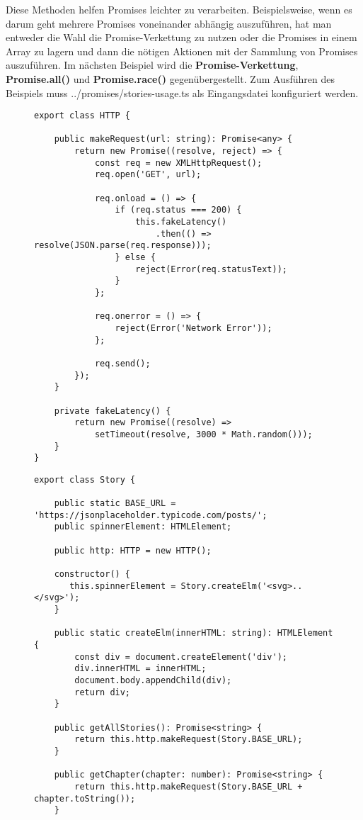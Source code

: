 \noindent
Diese Methoden helfen Promises leichter zu verarbeiten. Beispielsweise, wenn es darum geht mehrere Promises voneinander abhängig auszuführen, hat man entweder die Wahl die Promise-Verkettung zu nutzen oder die Promises in einem Array zu lagern und dann die nötigen Aktionen mit der Sammlung von Promises auszuführen. Im nächsten Beispiel wird die \textbf{Promise-Verkettung}, \textbf{Promise.all()} und \textbf{Promise.race()} gegenübergestellt. Zum Ausführen des Beispiels muss ../promises/stories-usage.ts als Eingangsdatei konfiguriert werden.


\begin{figure}[H]
\begin{lstlisting}[basicstyle=\small]
export class HTTP {

    public makeRequest(url: string): Promise<any> {
        return new Promise((resolve, reject) => {
            const req = new XMLHttpRequest();
            req.open('GET', url);

            req.onload = () => {
                if (req.status === 200) {
                    this.fakeLatency()
                        .then(() => resolve(JSON.parse(req.response)));
                } else {
                    reject(Error(req.statusText));
                }
            };

            req.onerror = () => {
                reject(Error('Network Error'));
            };

            req.send();
        });
    }

    private fakeLatency() {
        return new Promise((resolve) =>
            setTimeout(resolve, 3000 * Math.random()));
    }
}
\end{lstlisting}
\end{figure}

\begin{figure}[H]
\begin{lstlisting}[basicstyle=\small]
export class Story {

    public static BASE_URL = 'https://jsonplaceholder.typicode.com/posts/';
    public spinnerElement: HTMLElement;

    public http: HTTP = new HTTP();

    constructor() {
       this.spinnerElement = Story.createElm('<svg>..</svg>');
    }

    public static createElm(innerHTML: string): HTMLElement {
        const div = document.createElement('div');
        div.innerHTML = innerHTML;
        document.body.appendChild(div);
        return div;
    }
    
    public getAllStories(): Promise<string> {
        return this.http.makeRequest(Story.BASE_URL);
    }

    public getChapter(chapter: number): Promise<string> {
        return this.http.makeRequest(Story.BASE_URL + chapter.toString());
    }
\end{lstlisting}
\end{figure}

